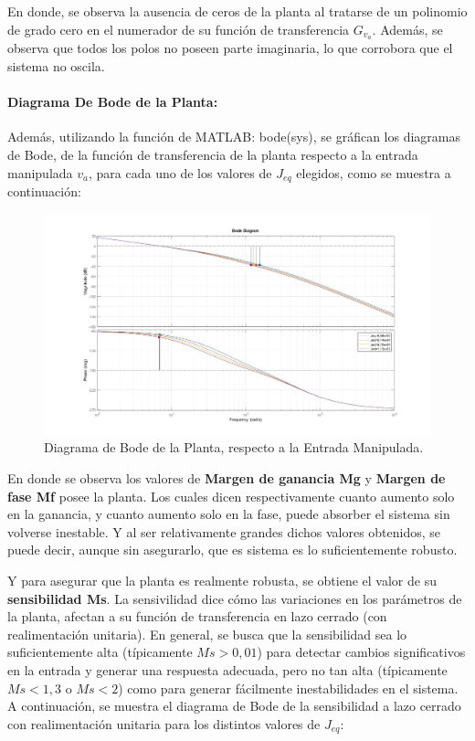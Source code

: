 \documentclass{article}
\begin{document}
\begin{sloppypar}
En donde, se observa la ausencia de ceros de la planta al tratarse de un polinomio de grado cero en el numerador de su función de transferencia $G_{v_a}$. Además, se observa que todos los polos no poseen parte imaginaria, lo que corrobora que el sistema no oscila.

\paragraph{Diagrama De Bode de la Planta:}
\label{sec:Diagrama De Bode de la Planta:}
\hfill

\hfill

Además, utilizando la función de MATLAB: bode(sys), se gráfican los diagramas de Bode, de la función de transferencia de la planta respecto a la entrada manipulada $v_a$, para cada uno de los valores de $J_{eq}$ elegidos, como se muestra a continuación:

\begin{figure}[H]
    \centering
    \includegraphics[width=1\textwidth]{Diagrama de Bode de la Planta, respecto a la Entrada Manipulada}
    \caption{Diagrama de Bode de la Planta, respecto a la Entrada Manipulada.}
    \label{fig:Diagrama de Bode de la Planta, respecto a la Entrada Manipulada}
\end{figure}

En donde se observa los valores de \textbf{Margen de ganancia Mg} y \textbf{Margen de fase Mf} posee la planta. Los cuales dicen respectivamente cuanto aumento solo en la ganancia, y cuanto aumento solo en la fase, puede absorber el sistema sin volverse inestable. Y al ser relativamente grandes dichos valores obtenidos, se puede decir, aunque sin asegurarlo, que es sistema es lo suficientemente robusto.

Y para asegurar que la planta es realmente robusta, se obtiene el valor de su \textbf{sensibilidad Ms}. La sensivilidad dice cómo las variaciones en los parámetros de la planta, afectan a su función de transferencia en lazo cerrado (con realimentación unitaria). En general, se busca que la sensibilidad sea lo suficientemente alta (típicamente $Ms>0,01$) para detectar cambios significativos en la entrada y generar una respuesta adecuada, pero no tan alta (típicamente $Ms<1,3$ o $Ms<2$) como para generar fácilmente inestabilidades en el sistema. A continuación, se muestra el diagrama de Bode de la sensibilidad a lazo cerrado con realimentación unitaria para los distintos valores de $J_{eq}$:


\end{sloppypar}
\end{document}
